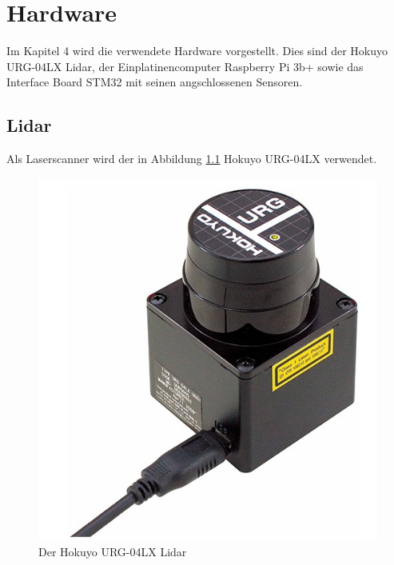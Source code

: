 \chapter{Hardware}

Im Kapitel 4 wird die verwendete Hardware vorgestellt. Dies sind der Hokuyo URG-04LX Lidar, der Einplatinencomputer Raspberry Pi 3b+ sowie das Interface Board STM32 mit seinen angschlossenen Sensoren. 






\section{Lidar}

Als Laserscanner wird der in Abbildung \ref{fig:hokuyo_lidar} Hokuyo URG-04LX verwendet.

\vspace{0.3cm}

\begin{figure}[hbtp]
\centering
\includegraphics[scale=0.6]{images/chapter4/lidar.png}
\caption{Der Hokuyo URG-04LX Lidar \cite{hokuyo_lidar.2018}}
\label{fig:hokuyo_lidar}
\end{figure}




